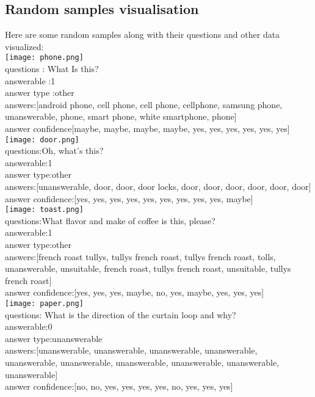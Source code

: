 \documentclass{report}
\begin{document}
\subsection{Random samples visualisation}
Here are some random samples along with their questions and other data visualized:\\
\texttt{[image: phone.png]}\\
questions : What  Is this?\\
answerable :1\\
answer type :other\\
answers:[android phone, cell phone, cell phone, cellphone, samsung phone, unanswerable, phone, smart phone, white smartphone, phone]\\
answer confidence[maybe, maybe, maybe, maybe, yes, yes, yes, yes, yes, yes]  \\                                                     

\texttt{[image: door.png]}\\
questions:Oh, what's this?\\
answerable:1\\
answer type:other\\
answers:[unanswerable, door, door, door locks, door, door, door, door, door, door]\\
answer confidence:[yes, yes, yes, yes, yes, yes, yes, yes, yes, maybe]\\


\texttt{[image: toast.png]}\\
questions:What flavor and make of coffee is this, please?\\
answerable:1\\
answer type:other\\
answers:[french roast tullys, tullys french roast, tullys french roast, tolls, unanswerable, unsuitable, french roast, tullys french roast, unsuitable, tullys french roast]\\
answer confidence:[yes, yes, yes, maybe, no, yes, maybe, yes, yes, yes]\\

    \texttt{[image: paper.png]}\\
questions: What is the direction of the curtain loop and why?\\
answerable:0\\
answer type:unanswerable\\
answers:[unanswerable, unanswerable, unanswerable, unanswerable, unanswerable, unanswerable, unanswerable, unanswerable, unanswerable, unanswerable]\\
answer confidence:[no, no, yes, yes, yes, yes, no, yes, yes, yes]
\end{document}
